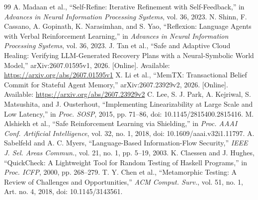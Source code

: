 \documentclass[conference]{IEEEtran}
\begin{document}
\begin{thebibliography}{99}
 A. Madaan et al., ``Self-Refine: Iterative Refinement with Self-Feedback,'' in \emph{Advances in Neural Information Processing Systems}, vol. 36, 2023.
 N. Shinn, F. Cassano, A. Gopinath, K. Narasimhan, and S. Yao, ``Reflexion: Language Agents with Verbal Reinforcement Learning,'' in \emph{Advances in Neural Information Processing Systems}, vol. 36, 2023.
 J. Tan et al., ``Safe and Adaptive Cloud Healing: Verifying LLM-Generated Recovery Plans with a Neural-Symbolic World Model,'' arXiv:2607.01595v1, 2026. [Online]. Available: \url{https://arxiv.org/abs/2607.01595v1}
 X. Li et al., ``MemTX: Transactional Belief Commit for Stateful Agent Memory,'' arXiv:2607.23929v2, 2026. [Online]. Available: \url{https://arxiv.org/abs/2607.23929v2}
 C. Lee, S. J. Park, A. Kejriwal, S. Matsushita, and J. Ousterhout, ``Implementing Linearizability at Large Scale and Low Latency,'' in \emph{Proc. SOSP}, 2015, pp. 71--86, doi: 10.1145/2815400.2815416.
 M. Alshiekh et al., ``Safe Reinforcement Learning via Shielding,'' in \emph{Proc. AAAI Conf. Artificial Intelligence}, vol. 32, no. 1, 2018, doi: 10.1609/aaai.v32i1.11797.
 A. Sabelfeld and A. C. Myers, ``Language-Based Information-Flow Security,'' \emph{IEEE J. Sel. Areas Commun.}, vol. 21, no. 1, pp. 5--19, 2003.
 K. Claessen and J. Hughes, ``QuickCheck: A Lightweight Tool for Random Testing of Haskell Programs,'' in \emph{Proc. ICFP}, 2000, pp. 268--279.
 T. Y. Chen et al., ``Metamorphic Testing: A Review of Challenges and Opportunities,'' \emph{ACM Comput. Surv.}, vol. 51, no. 1, Art. no. 4, 2018, doi: 10.1145/3143561.
\end{thebibliography}
\end{document}
